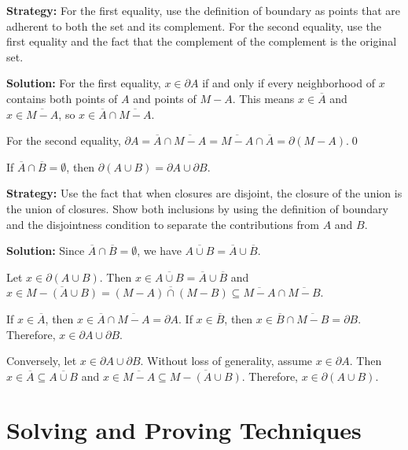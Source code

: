 \noindent\textbf{Strategy:} For the first equality, use the definition of boundary as points that are adherent to both the set and its complement. For the second equality, use the first equality and the fact that the complement of the complement is the original set.

\bigskip\noindent\textbf{Solution:} For the first equality, $x \in \partial A$ if and only if every neighborhood of $x$ contains both points of $A$ and points of $M - A$. This means $x \in \overline{A}$ and $x \in \overline{M - A}$, so $x \in \overline{A} \cap \overline{M - A}$.

For the second equality, $\partial A = \overline{A} \cap \overline{M - A} = \overline{M - A} \cap \overline{A} = \partial(M - A)$.\qed


\begin{problembox}
\begin{problemstatement}
If \(\overline{A} \cap \overline{B} = \emptyset\), then \(\partial(A \cup B) = \partial A \cup \partial B\).
\end{problemstatement}
\end{problembox}

\noindent\textbf{Strategy:} Use the fact that when closures are disjoint, the closure of the union is the union of closures. Show both inclusions by using the definition of boundary and the disjointness condition to separate the contributions from $A$ and $B$.

\bigskip\noindent\textbf{Solution:} Since $\overline{A} \cap \overline{B} = \emptyset$, we have $\overline{A \cup B} = \overline{A} \cup \overline{B}$.

Let $x \in \partial(A \cup B)$. Then $x \in \overline{A \cup B} = \overline{A} \cup \overline{B}$ and $x \in \overline{M - (A \cup B)} = \overline{(M - A) \cap (M - B)} \subseteq \overline{M - A} \cap \overline{M - B}$.

If $x \in \overline{A}$, then $x \in \overline{A} \cap \overline{M - A} = \partial A$. If $x \in \overline{B}$, then $x \in \overline{B} \cap \overline{M - B} = \partial B$. Therefore, $x \in \partial A \cup \partial B$.

Conversely, let $x \in \partial A \cup \partial B$. Without loss of generality, assume $x \in \partial A$. Then $x \in \overline{A} \subseteq \overline{A \cup B}$ and $x \in \overline{M - A} \subseteq \overline{M - (A \cup B)}$. Therefore, $x \in \partial(A \cup B)$.


\section{Solving and Proving Techniques}

